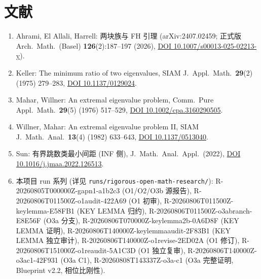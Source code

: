 \documentclass[UTF8]{ctexart}
\begin{document}
\section{文献}
\sloppy
\begin{enumerate}
\raggedright
	\item Ahrami, El Allali, Harrell: 两块族与 FH 引理 (arXiv:2407.02459; 正式版
	Arch.\ Math.\ (Basel) \textbf{126}(2):187--197 (2026),
	\href{https://doi.org/10.1007/s00013-025-02213-y}{DOI 10.1007/s00013-025-02213-y}).
	\item Keller: The minimum ratio of two eigenvalues, SIAM J.\ Appl.\ Math.\
	\textbf{29}(2) (1975) 279--283,
	\href{https://doi.org/10.1137/0129024}{DOI 10.1137/0129024}.
	\item Mahar, Willner: An extremal eigenvalue problem, Comm.\ Pure Appl.\ Math.\
	\textbf{29}(5) (1976) 517--529,
	\href{https://doi.org/10.1002/cpa.3160290505}{DOI 10.1002/cpa.3160290505}.
	\item Willner, Mahar: An extremal eigenvalue problem II, SIAM J.\ Math.\ Anal.\
	\textbf{13}(4) (1982) 633--643,
	\href{https://doi.org/10.1137/0513040}{DOI 10.1137/0513040}.
	\item Sun: 有界跳数类最小间距 (INF 侧), J.\ Math.\ Anal.\ Appl.\ (2022),
	\href{https://doi.org/10.1016/j.jmaa.2022.126513}{DOI 10.1016/j.jmaa.2022.126513}.
	\item 本项目 run 系列 (详见 \texttt{runs/rigorous-open-math-research/}):
		R-20260805T000000Z-gapn1-a1b2c3 (O1/O2/O3b 源报告),
		R-20260806T011500Z-o1audit-422A69 (O1 初审), R-20260806T011500Z-keylemma-E58FB1 (KEY LEMMA 归约),
		R-20260806T011500Z-o3abranch-E8E56F (O3a 分支), R-20260806T070000Z-keylemma2b-0A6D8F (KEY LEMMA 证明),
		R-20260806T140000Z-keylemmaaudit-2F83B1 (KEY LEMMA 独立审计), R-20260806T140000Z-o1revise-2ED02A (O1 修订),
		R-20260806T151000Z-o1reaudit-5A1C3D (O1 独立复审), R-20260806T140000Z-o3ac1-42F931 (O3a C1),
		R-20260808T143337Z-o3a-c1 (O3a 完整证明, Blueprint v2.2, 相位比刚性).
\end{enumerate}
\end{document}
